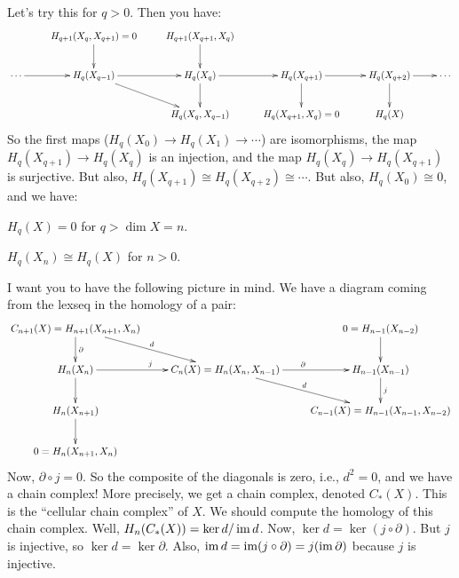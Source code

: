 Let's try this for $q>0$. Then you have:
\begin{equation*}
\xymatrix{ & H_{q+1}(X_q,X_{q+1})=0\ar[d]& H_{q+1}(X_{q+1},X_q)\ar[d]\\
\ar[r]\cdots & H_q(X_{q-1})\ar[r]\ar[dr] & H_q(X_q)\ar[r]\ar[d] & H_q(X_{q+1})\ar[r]\ar[d] & H_q(X_{q+2})\ar[d]\ar[r] & \cdots\\
& & H_q(X_{q},X_{q-1}) & H_q(X_{q+1},X_q)=0 & H_q(X)}
\end{equation*}
So the first maps ($ H_q(X_0)\to H_q(X_1)\to\cdots$) are isomorphisms, the map $ H_q(X_{q+1})\to H_q(X_q)$ is an injection, and the map $ H_q(X_q)\to H_q(X_{q+1})$ is surjective. But also, $ H_q(X_{q+1})\cong H_q(X_{q+2})\cong \cdots$. But also, $ H_q(X_0)\cong 0$, and we have:
\begin{corollary}
$ H_q(X)=0$ for $q>\dim X=n$.
\end{corollary}
\begin{lemma}
$ H_q(X_n)\cong H_q(X)$ for $n>0$.
\end{lemma}
I want you to have the following picture in mind. We have a diagram coming from the lexseq in the homology of a pair:
\begin{equation*}
\xymatrix{C_{n+1}(X)= H_{n+1}(X_{n+1},X_n)\ar[d]^\partial\ar[dr]^d & & 0= H_{n-1}(X_{n-2})\ar[d]\\
 H_n(X_n)\ar[r]^j\ar[d] & C_n(X)= H_n(X_n,X_{n-1})\ar[r]^\partial\ar[dr]^d & H_{n-1}(X_{n-1})\ar[d]^j\\
 H_n(X_{n+1})\ar[d] & & C_{n-1}(X)= H_{n-1}(X_{n-1},X_{n-2})\\
0 = H_n(X_{n+1},X_n)}
\end{equation*}
Now, $\partial\circ j=0$. So the composite of the diagonals is zero, i.e., $d^2=0$, and we have a chain complex! More precisely, we get a chain complex, denoted $C_\ast(X)$. This is the ``cellular chain complex'' of $X$. We should compute the homology of this chain complex. Well, $ H_n(C_\ast(X))=\ker d/\operatorname{im} d$. Now, $\ker d=\ker (j\circ\partial)$. But $j$ is injective, so $\ker d=\ker\partial$. Also, $\operatorname{im} d=\operatorname{im}(j\circ\partial)=j(\operatorname{im}\partial)$ because $j$ is injective.

